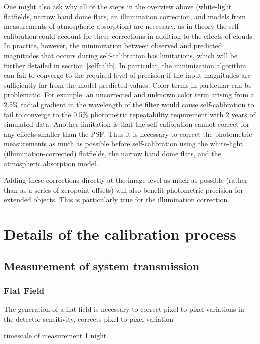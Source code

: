 \documentclass[12pt,preprint]{aastex}
\begin{document}
One might also ask why all of the steps in the overview above
(white-light flatfields, narrow band dome flats, an illumination
correction, and models from measurements of atmospheric absorption)
are necessary, as in theory the self-calibration could account for
these corrections in addition to the effects of clouds. In practice,
however, the minimization between observed and predicted magnitudes
that occurs during self-calibration has limitations, which will be
further detailed in section~\ref{selfcalib}.  In particular, the
minimization algorithm can fail to converge to the required level of
precision if the input magnitudes are sufficiently far from the model
predicted values.  Color terms in particular can be problematic. For
example, an uncorrected and unknown color term arising from a 2.5\%
radial gradient in the wavelength of the filter would cause
self-calibration to fail to converge to the 0.5\% photometric
repeatability requirement with 2 years of simulated data. Another
limitation is that the self-calibration cannot correct for any effects
smaller than the PSF. Thus it is necessary to correct the photometric
measurements as much as possible before self-calibration using the
white-light (illumination-corrected) flatfields, the narrow band dome
flats, and the atmospheric absorption model.

Adding these corrections directly at the image level as much as possible (rather than as a
series of zeropoint offsets) will also benefit photometric
precision for extended objects. This is particularly true for the
illumination correction. 

\section{Details of the calibration process}

\subsection{Measurement of system transmission}

\subsubsection{Flat Field}

The generation of a flat field is necessary to correct pixel-to-pixel
variations in the detector sensitivity, 
corrects pixel-to-pixel variation

timescale of measurement 1 night
\end{document}
